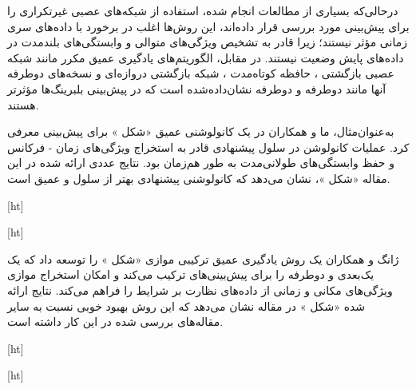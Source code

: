 درحالی‌که بسیاری از مطالعات انجام شده، استفاده از شبکه‌های عصبی غیرتکراری را برای پیش‌بینی  مورد بررسی قرار داده‌اند، این روش‌ها اغلب در برخورد با داده‌های سری زمانی مؤثر نیستند؛ زیرا قادر به تشخیص ویژگی‌های متوالی و وابستگی‌های بلندمدت در داده‌های پایش وضعیت نیستند. در مقابل، الگوریتم‌های یادگیری عمیق مکرر مانند شبکه عصبی بازگشتی ، حافظه کوتاه‌مدت ، شبکه بازگشتی دروازه‌ای  و نسخه‌های دوطرفه آنها مانند  دوطرفه  و  دوطرفه نشان‌داده‌شده است که در پیش‌بینی  بلبرینگ‌ها مؤثرتر هستند. 





به‌عنوان‌مثال، ما و همکاران در  یک  کانولوشنی عمیق «شکل » برای پیش‌بینی  معرفی کرد. عملیات کانولوشن در سلول  پیشنهادی قادر به استخراج ویژگی‌های زمان - فرکانس و حفظ وابستگی‌های طولانی‌مدت به طور هم‌زمان بود. نتایج عددی ارائه شده در این مقاله «شکل »، نشان می‌دهد که  کانولوشنی پیشنهادی بهتر از سلول  و  عمیق است. 


[ht]



[ht]





ژانگ و همکاران  یک روش یادگیری عمیق ترکیبی موازی «شکل » را توسعه داد که یک  یک‌بعدی و  دوطرفه را برای پیش‌بینی‌های  ترکیب می‌کند و امکان استخراج موازی ویژگی‌های مکانی و زمانی از داده‌های نظارت بر شرایط را فراهم می‌کند. نتایج ارائه شده «شکل » در مقاله نشان می‌دهد که این روش بهبود خوبی نسبت به سایر مقاله‌های بررسی شده در این کار داشته است.



[ht]



[ht]



